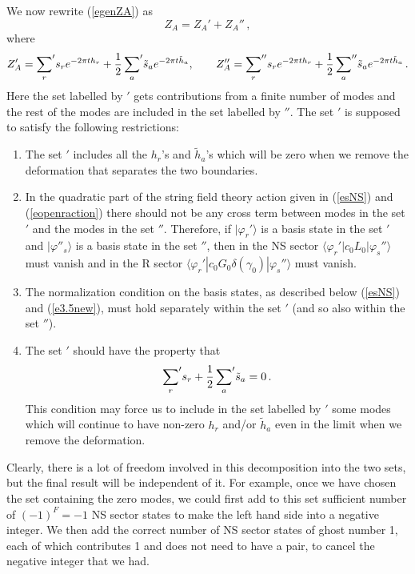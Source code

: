 \documentclass[12pt,a4paper]{article}
\newcommand{\be}{\begin{equation}}
\newcommand{\ee}{\end{equation}}
\newcommand{\refb}[1]{(\ref{#1})}
\newcommand{\vp}{\varphi}
\begin{document}
We now rewrite \refb{egenZA} as
\be
\label{ebeginA}
Z_A=Z_A'+Z_A''\, ,
\ee
where
\be
\label{e311new}
Z_A'={\sum_r}' s_r e^{-2\pi t h_r} +{1\over 2}\,{\sum_a}' \tilde s_a e^{-2\pi t \tilde h_a},
\qquad
Z_A''={\sum_r}'' s_r e^{-2\pi t h_r} +{1\over 2}\,{\sum_a}'' \tilde s_a e^{-2\pi t \tilde h_a}\, .
\ee
Here the set labelled by $'$ gets contributions from a finite number of modes and the rest of the modes are
included in the set labelled by $''$. The set $'$ is supposed to satisfy the following restrictions:
\begin{enumerate}
\item The set $'$ includes all the $h_r$'s and $\tilde h_a$'s which will be
zero when we remove the deformation that separates the two boundaries.
\item In the quadratic part of the string field theory action given in \refb{esNS} and
\refb{eopenraction} there should not be any cross term between modes in the set
$'$ and the modes in the set $''$. Therefore, if $|\vp_r'\rangle$ is a basis state in the
set $'$ and $|\vp''_s\rangle$ is a basis state in the set $''$, then in the NS sector
$\langle \vp_r'|c_0 L_0|\vp_s''\rangle$ must vanish and in the R sector
$\langle \vp_r'|c_0 G_0\delta(\gamma_0)|\vp_s''\rangle$ must vanish.
\item The normalization condition on the basis states, as described below \refb{esNS}
and \refb{e3.5new}, must hold separately within the set $'$ (and so also within the set $''$).
\item The set $'$  should have the
property that
\be \label{eccd4}
{\sum_r}' s_r +{1\over 2} \,  {\sum_a}'\tilde s_a =0\, .
\ee
This condition may force us to include  in the set labelled by $'$
some modes which will continue to
have non-zero $h_r$ and/or
$\tilde h_a$ even in the limit when we remove the deformation.
\end{enumerate}
Clearly, there is a lot of freedom involved in this decomposition into the two sets,
but the final result will be independent of it. For example, once we have chosen the
set containing the zero modes,
we could first add to this set sufficient number of
$(-1)^F=-1$ NS sector states to make the left hand side into a negative integer.
We then add
the correct number of NS sector states of ghost number 1, each of which contributes
1 and does not need to have a pair, to cancel the negative integer that we had.
\end{document}
